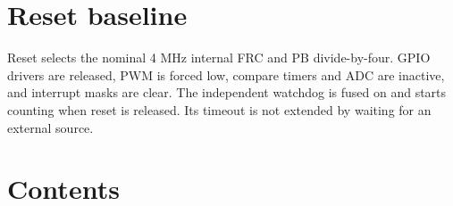 \documentclass[10pt]{article}
\begin{document}
\section*{Reset baseline}
Reset selects the nominal 4 MHz internal FRC and PB divide-by-four. GPIO drivers are released, PWM is forced low, compare timers and ADC are inactive, and interrupt masks are clear. The independent watchdog is fused on and starts counting when reset is released. Its timeout is not extended by waiting for an external source.

\newpage
{}
\section*{Contents}
\end{document}
